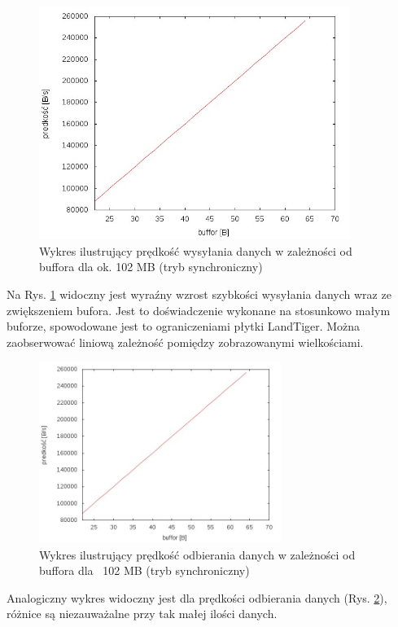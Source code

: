 \documentclass{BscUS}
\begin{document}
\begin{figure}[H]
{
\centering
\includegraphics[width=0.9\textwidth]{./img/S_107374200Send}
\caption{Wykres ilustrujący prędkość wysyłania danych w zależności od buffora dla ok. 102 MB (tryb synchroniczny)}
\label{fig:S_107374200Send}
}
\end{figure}
\noindent Na Rys. \ref{fig:S_107374200Send} widoczny jest wyraźny wzrost szybkości wysyłania danych wraz ze zwiększeniem bufora. Jest to doświadczenie wykonane na stosunkowo małym buforze, spowodowane jest to ograniczeniami płytki LandTiger. Można zaobserwować liniową zależność pomiędzy zobrazowanymi wielkościami.
\begin{figure}[H]
{
\centering
\includegraphics[width=0.7\textwidth]{./img/S_107374200Receive}
\caption{Wykres ilustrujący prędkość odbierania danych w zależności od buffora dla ~102 MB (tryb synchroniczny)}
\label{fig:S_107374200Receive}
}
\end{figure}
\noindent Analogiczny wykres widoczny jest dla prędkości odbierania danych (Rys. \ref{fig:S_107374200Receive}), różnice są niezauważalne przy tak małej ilości danych.
\end{document}
